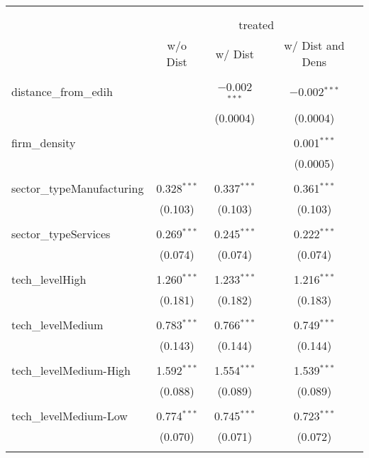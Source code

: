 
\begin{table}[!htbp] \centering 
  \caption{} 
  \label{} 
\begin{tabular}{@{\extracolsep{5pt}}lccc} 
\\[-1.8ex]\hline 
\hline \\[-1.8ex] 
\\[-1.8ex] & \multicolumn{3}{c}{treated} \\ 
 & w/o Dist & w/ Dist & w/ Dist and Dens \\ 
\hline \\[-1.8ex] 
 distance\_from\_edih &  & $-$0.002$^{***}$ & $-$0.002$^{***}$ \\ 
  &  & (0.0004) & (0.0004) \\ 
  & & & \\ 
 firm\_density &  &  & 0.001$^{***}$ \\ 
  &  &  & (0.0005) \\ 
  & & & \\ 
 sector\_typeManufacturing & 0.328$^{***}$ & 0.337$^{***}$ & 0.361$^{***}$ \\ 
  & (0.103) & (0.103) & (0.103) \\ 
  & & & \\ 
 sector\_typeServices & 0.269$^{***}$ & 0.245$^{***}$ & 0.222$^{***}$ \\ 
  & (0.074) & (0.074) & (0.074) \\ 
  & & & \\ 
 tech\_levelHigh & 1.260$^{***}$ & 1.233$^{***}$ & 1.216$^{***}$ \\ 
  & (0.181) & (0.182) & (0.183) \\ 
  & & & \\ 
 tech\_levelMedium & 0.783$^{***}$ & 0.766$^{***}$ & 0.749$^{***}$ \\ 
  & (0.143) & (0.144) & (0.144) \\ 
  & & & \\ 
 tech\_levelMedium-High & 1.592$^{***}$ & 1.554$^{***}$ & 1.539$^{***}$ \\ 
  & (0.088) & (0.089) & (0.089) \\ 
  & & & \\ 
 tech\_levelMedium-Low & 0.774$^{***}$ & 0.745$^{***}$ & 0.723$^{***}$ \\ 
  & (0.070) & (0.071) & (0.072) \\ 
  & & & \\ 

\end{tabular}
\end{table}
